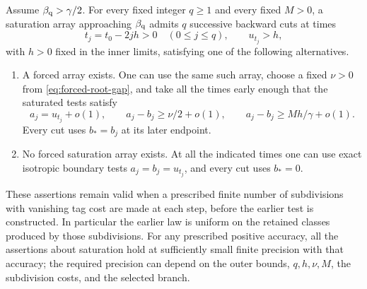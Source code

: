 \begin{proposition}
\label{prop:boundary-alternatives}
Assume $\beta_{\mathrm q}>\gamma/2$.  For every fixed integer $q\ge1$ and every
fixed $M>0$, a saturation array approaching $\beta_{\mathrm q}$ admits $q$ successive
backward cuts at times
\[
 t_j=t_0-2jh>0\quad(0\le j\le q),\qquad u_{t_j}>h,
\]
with $h>0$ fixed in the inner limits, satisfying one of the following
alternatives.
\begin{enumerate}
\item A forced array exists. One can use the same such array,
choose a fixed $\nu>0$ from \eqref{eq:forced-root-gap}, and take all
the times early enough that the saturated tests satisfy
\[
 a_j=u_{t_j}+o(1),\qquad
 a_j-b_j\ge\nu/2+o(1),\qquad
 a_j-b_j\ge M h/\gamma+o(1).
\]
Every cut uses $b_*=b_j$ at its later endpoint.
\item No forced saturation array exists. At all the indicated
times one can use exact isotropic boundary tests
$a_j=b_j=u_{t_j}$, and every cut uses $b_*=0$.
\end{enumerate}
These assertions remain valid when a prescribed finite number of
subdivisions with vanishing tag cost are made at each step, before
the earlier test is constructed.  In particular the earlier law is
uniform on the retained classes produced by those subdivisions.
For any prescribed positive accuracy, all the assertions about
saturation hold at sufficiently small finite precision with that
accuracy; the required precision can depend on the outer bounds,
$q,h,\nu,M$, the subdivision costs, and the selected branch.
\end{proposition}

